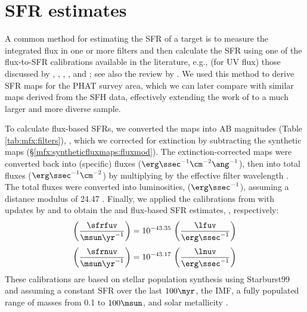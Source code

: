 \section{SFR estimates}\label{mfx:sfrestimates}

A common method for estimating the SFR of a target is to measure the integrated
flux in one or more filters and then calculate the SFR using one of the
flux-to-SFR calibrations available in the literature, e.g., (for UV flux) those
discussed by \citet{Kennicutt:1998}, \citet{Salim:2007}, \citet{Hao:2011},
\citet{Murphy:2011}, and \citet{Leroy:2012}; see also the review by
\citet{Kennicutt:2012}. We used this method to derive SFR maps for the PHAT
survey area, which we can later compare with similar maps derived from the
\citet{Lewis:2014} SFH data, effectively extending the work of
\citet{Simones:2014} to a much larger and more diverse sample.

To calculate flux-based SFRs, we converted the \fxobs{} maps into AB magnitudes
(Table \ref{tab:mfx:filters}), \xobs{}, which we corrected for extinction by
subtracting the synthetic \ax{} maps (\S \ref{mfx:syntheticfluxmaps:fluxmod}).
The extinction-corrected maps were converted back into (specific) fluxes ($\erg
\ssec^{-1} \cm^{-2} \ang^{-1}$), then into total fluxes ($\erg \ssec^{-1}
\cm^{-2}$) by multiplying by the effective filter wavelength
\citep[$1538.6\ang$ for \fuv{}, $2315.7\ang$ for \nuv{};][]{Morrissey:2007}.
The total fluxes were converted into luminosities, \lx{} ($\erg \ssec^{-1}$),
assuming a distance modulus of 24.47 \citep{McConnachie:2005}. Finally, we
applied the calibrations from \citet{Kennicutt:1998} with updates by
\citet{Hao:2011} and \citet{Murphy:2011} \citep[see the review
by][]{Kennicutt:2012} to obtain the \fuv{} and \nuv{} flux-based SFR estimates,
\sfrx{}, respectively:
\begin{equation}
\left(\frac{\sfrfuv}{\msun\yr^{-1}}\right) =
    10^{-43.35}\,\left(\frac{\lfuv}{\erg\ssec^{-1}}\right)
\label{mfx:eq:fuvcal}
\end{equation}
\begin{equation}
\left(\frac{\sfrnuv}{\msun\yr^{-1}}\right) =
    10^{-43.17}\,\left(\frac{\lnuv}{\erg\ssec^{-1}}\right)
\label{mfx:eq:nuvcal}
\end{equation}
These calibrations are based on stellar population synthesis using Starburst99
\citep{Leitherer:1999} and assuming a constant SFR over the last $100\myr$, the
\citet{Kroupa:2001} IMF, a fully populated range of masses from 0.1 to
$100\msun$, and solar metallicity \citep{Hao:2011}.

